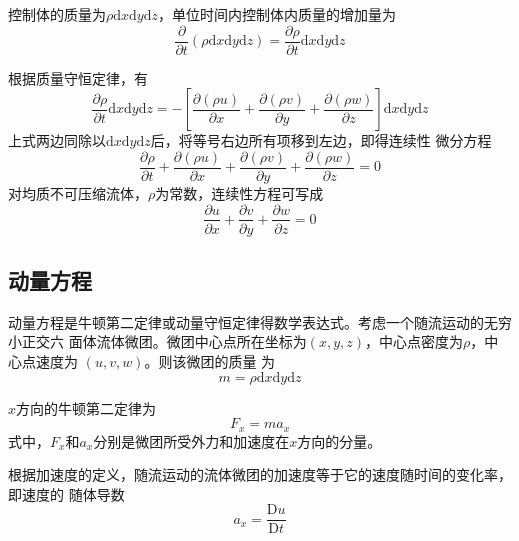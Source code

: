 控制体的质量为$\rho\mathrm{d}x\mathrm{d}y\mathrm{d}z$，单位时间内控制体内质量的增加量为
\begin{equation}
  \frac{\partial}{\partial t}(\rho\mathrm{d}x\mathrm{d}y\mathrm{d}z) = 
  \frac{\partial \rho}{\partial  t}\mathrm{d}x\mathrm{d}y\mathrm{d}z
\end{equation}

根据质量守恒定律，有
\begin{equation}
  \frac{\partial \rho}{\partial  t}\mathrm{d}x\mathrm{d}y\mathrm{d}z
  =
-
\left[
  \frac {\partial (\rho u)} {\partial x}
  +
  \frac {\partial (\rho v)} {\partial y}
  +
  \frac {\partial (\rho w)} {\partial z}
\right]
\mathrm{d}x\mathrm{d}y\mathrm{d}z
\end{equation}
上式两边同除以$\mathrm{d}x\mathrm{d}y\mathrm{d}z$后，将等号右边所有项移到左边，即得连续性
微分方程
\begin{equation}
  \frac{\partial \rho}{\partial  t} 
  +
  \frac{\partial (\rho u)}{\partial  x} 
  +
  \frac{\partial (\rho v)}{\partial  y} 
  +
  \frac{\partial (\rho w)}{\partial  z} 
  =
  0
\end{equation}
对均质不可压缩流体，$\rho$为常数，连续性方程可写成
\begin{equation}
  \frac{\partial u}{\partial  x} 
  +
  \frac{\partial v}{\partial  y} 
  +
  \frac{\partial w}{\partial  z} 
  =
  0
  \label{EqCGe_NS_Ce}
\end{equation}

\subsection{动量方程}
动量方程是牛顿第二定律或动量守恒定律得数学表达式。考虑一个随流运动的无穷小正交六
面体流体微团。微团中心点所在坐标为$(x,y,z)$，中心点密度为$\rho$，中心点速度为
$(u, v, w)$。则该微团的质量
为
\begin{equation}
m = \rho\mathrm{d}x\mathrm{d}y\mathrm{d}z
\end{equation}

$x$方向的牛顿第二定律为
\begin{equation}
  F_{x} = ma_{x}
\end{equation}
式中，$F_{x}$和$a_{x}$分别是微团所受外力和加速度在$x$方向的分量。

根据加速度的定义，随流运动的流体微团的加速度等于它的速度随时间的变化率，即速度的
随体导数
\begin{equation}
  a_{x} = 
  \frac{\mathrm{D}u}{\mathrm{D}t}
\end{equation}

